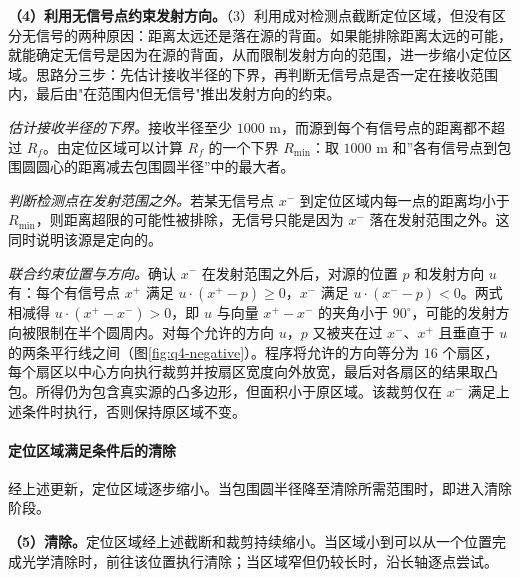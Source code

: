 \textbf{（4）利用无信号点约束发射方向。}（3）利用成对检测点截断定位区域，但没有区分无信号的两种原因：距离太远还是落在源的背面。如果能排除距离太远的可能，就能确定无信号是因为在源的背面，从而限制发射方向的范围，进一步缩小定位区域。思路分三步：先估计接收半径的下界，再判断无信号点是否一定在接收范围内，最后由"在范围内但无信号"推出发射方向的约束。

\emph{估计接收半径的下界。}接收半径至少 $1000$ m，而源到每个有信号点的距离都不超过 $R_f$。由定位区域可以计算 $R_f$ 的一个下界 $R_{\min}$：取 $1000$ m 和”各有信号点到包围圆圆心的距离减去包围圆半径”中的最大者。

\emph{判断检测点在发射范围之外。}若某无信号点 $x^-$ 到定位区域内每一点的距离均小于 $R_{\min}$，则距离超限的可能性被排除，无信号只能是因为 $x^-$ 落在发射范围之外。这同时说明该源是定向的。

\emph{联合约束位置与方向。}确认 $x^-$ 在发射范围之外后，对源的位置 $p$ 和发射方向 $u$ 有：每个有信号点 $x^+$ 满足 $u\cdot(x^+-p)\ge0$，$x^-$ 满足 $u\cdot(x^--p)<0$。两式相减得 $u\cdot(x^+-x^-)>0$，即 $u$ 与向量 $x^+-x^-$ 的夹角小于 $90^\circ$，可能的发射方向被限制在半个圆周内。对每个允许的方向 $u$，$p$ 又被夹在过 $x^-$、$x^+$ 且垂直于 $u$ 的两条平行线之间（图\ref{fig:q4-negative}）。程序将允许的方向等分为 $16$ 个扇区，每个扇区以中心方向执行裁剪并按扇区宽度向外放宽，最后对各扇区的结果取凸包。所得仍为包含真实源的凸多边形，但面积小于原区域。该裁剪仅在 $x^-$ 满足上述条件时执行，否则保持原区域不变。

\begin{center}
\begin{minipage}{\linewidth}
\centering
\QFourNegativeFigure
{}
\label{fig:q4-negative}
\end{minipage}
\end{center}

\paragraph{定位区域满足条件后的清除}

经上述更新，定位区域逐步缩小。当包围圆半径降至清除所需范围时，即进入清除阶段。

\textbf{（5）清除。}定位区域经上述截断和裁剪持续缩小。当区域小到可以从一个位置完成光学清除时，前往该位置执行清除；当区域窄但仍较长时，沿长轴逐点尝试。


